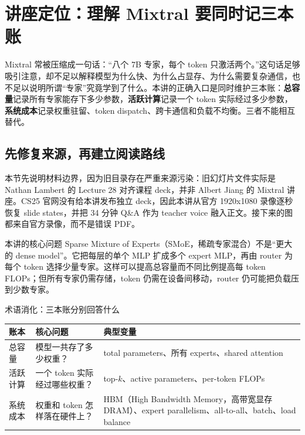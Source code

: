 \section{讲座定位：理解 Mixtral 要同时记三本账}

Mixtral 常被压缩成一句话：“八个 7B 专家，每个 token 只激活两个。”这句话足够吸引注意，却不足以解释模型为什么快、为什么占显存、为什么需要复杂通信，也不足以说明所谓“专家”究竟学到了什么。本讲的正确入口是同时维护三本账：\textbf{总容量}记录所有专家能存下多少参数，\textbf{活跃计算}记录一个 token 实际经过多少参数，\textbf{系统成本}记录权重驻留、token dispatch、跨卡通信和负载不均衡。三者不能相互替代。

\subsection{先修复来源，再建立阅读路线}

本节先说明材料边界，因为旧目录存在严重来源污染：旧幻灯片文件实际是 Nathan Lambert 的 Lecture 28 对齐课程 deck，并非 Albert Jiang 的 Mixtral 讲座。CS25 官网没有给本讲发布独立 deck，因此本讲从官方 1920x1080 录像逐秒恢复 slide states，并把 34 分钟 Q\&A 作为 teacher voice 融入正文。接下来的图都来自官方录像，而不是错误 PDF。


\begin{importantbox}{本讲的核心问题}
Sparse Mixture of Experts（SMoE，稀疏专家混合）不是“更大的 dense model”。它把每层的单个 MLP 扩成多个 expert MLP，再由 router 为每个 token 选择少量专家。这样可以提高总容量而不同比例提高每 token FLOPs；但所有专家仍需存储，token 仍需在设备间移动，router 仍可能把负载压到少数专家。
\end{importantbox}

\begin{knowledgebox}{术语消化：三本账分别回答什么}
\begin{tabularx}{\textwidth}{L{0.18\textwidth} L{0.28\textwidth} X}
\toprule
账本 & 核心问题 & 典型变量 \\
\midrule
总容量 & 模型一共存了多少权重？ & total parameters、所有 experts、shared attention \\
活跃计算 & 一个 token 实际经过哪些权重？ & top-$k$、active parameters、per-token FLOPs \\
系统成本 & 权重和 token 怎样落在硬件上？ & HBM（High Bandwidth Memory，高带宽显存 DRAM）、expert parallelism、all-to-all、batch、load balance \\
\bottomrule
\end{tabularx}
\end{knowledgebox}


